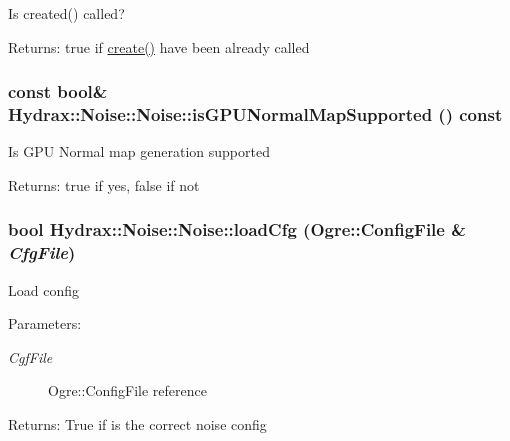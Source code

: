 Is created() called? \begin{Desc}
\item[Returns:]true if \hyperlink{class_hydrax_1_1_noise_1_1_noise_be9cf8765feed765e6a35b0779125f6a}{create()} have been already called \end{Desc}
\hypertarget{class_hydrax_1_1_noise_1_1_noise_20e13eb2f5cc93d384bb846b05d7aaeb}{
\subsubsection[{isGPUNormalMapSupported}]{\setlength{\rightskip}{0pt plus 5cm}const bool\& Hydrax::Noise::Noise::isGPUNormalMapSupported () const}}
\label{class_hydrax_1_1_noise_1_1_noise_20e13eb2f5cc93d384bb846b05d7aaeb}


Is GPU Normal map generation supported \begin{Desc}
\item[Returns:]true if yes, false if not \end{Desc}
\hypertarget{class_hydrax_1_1_noise_1_1_noise_5ef6e71282a9dfcefc09e3ba84a7578f}{
\subsubsection[{loadCfg}]{\setlength{\rightskip}{0pt plus 5cm}bool Hydrax::Noise::Noise::loadCfg (Ogre::ConfigFile \& {\em CfgFile})}}
\label{class_hydrax_1_1_noise_1_1_noise_5ef6e71282a9dfcefc09e3ba84a7578f}


Load config \begin{Desc}
\item[Parameters:]
\begin{description}
\item[{\em CgfFile}]Ogre::ConfigFile reference \end{description}
\end{Desc}
\begin{Desc}
\item[Returns:]True if is the correct noise config \end{Desc}



